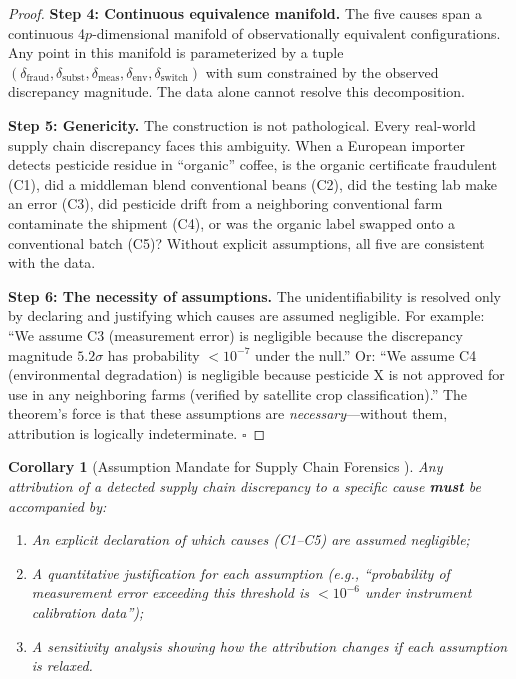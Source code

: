 \documentclass[11pt,a4paper]{article}
\newtheorem{corollary}[theorem]{Corollary}
\theoremstyle{definition}
\theoremstyle{remark}
\begin{document}
\begin{proof}
\textbf{Step 4: Continuous equivalence manifold.} The five causes span a continuous 4$p$-dimensional manifold of observationally equivalent configurations. Any point in this manifold is parameterized by a tuple $(\delta_{\text{fraud}}, \delta_{\text{subst}}, \delta_{\text{meas}}, \delta_{\text{env}}, \delta_{\text{switch}})$ with sum constrained by the observed discrepancy magnitude. The data alone cannot resolve this decomposition.

\textbf{Step 5: Genericity.} The construction is not pathological. Every real-world supply chain discrepancy faces this ambiguity. When a European importer detects pesticide residue in ``organic'' coffee, is the organic certificate fraudulent (C1), did a middleman blend conventional beans (C2), did the testing lab make an error (C3), did pesticide drift from a neighboring conventional farm contaminate the shipment (C4), or was the organic label swapped onto a conventional batch (C5)? Without explicit assumptions, all five are consistent with the data.

\textbf{Step 6: The necessity of assumptions.} The unidentifiability is resolved only by declaring and justifying which causes are assumed negligible. For example: ``We assume C3 (measurement error) is negligible because the discrepancy magnitude $5.2\sigma$ has probability $< 10^{-7}$ under the null.'' Or: ``We assume C4 (environmental degradation) is negligible because pesticide X is not approved for use in any neighboring farms (verified by satellite crop classification).'' The theorem's force is that these assumptions are \textit{necessary}---without them, attribution is logically indeterminate. \hfill $\square$
\end{proof}

\begin{corollary}[Assumption Mandate for Supply Chain Forensics ]
\label{cor:assumption_mandate}
Any attribution of a detected supply chain discrepancy to a specific cause \textbf{must} be accompanied by:
\begin{enumerate}[label=(\roman*)]
    \item An explicit declaration of which causes (C1--C5) are assumed negligible;
    \item A quantitative justification for each assumption (e.g., ``probability of measurement error exceeding this threshold is $< 10^{-6}$ under instrument calibration data'');
    \item A sensitivity analysis showing how the attribution changes if each assumption is relaxed.
\end{enumerate}
\end{corollary}
\end{document}
